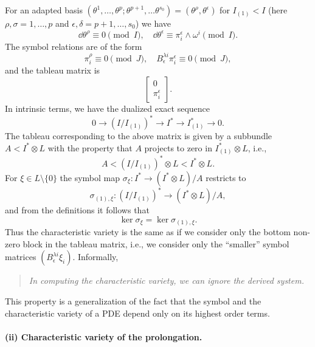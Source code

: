 For an adapted basis $(\theta^1,\ldots,\theta^p;\theta^{p+1},\ldots\theta^{s_0})=(\theta^\rho,\theta^\epsilon)$ for $I_{(1)}<I$ (here $\rho,\sigma=1,\ldots,p$ and $\epsilon,\delta=p+1,\ldots,s_0$) we have 
\[\dd \theta^\rho\equiv 0\pmod{I},\quad \dd\theta^\epsilon\equiv \pi^\epsilon_i\wedge\omega^i\pmod{I}.\]
The symbol relations are of the form 
\[\pi^\rho_i\equiv 0\pmod{J},\quad B^{\lambda i}_\epsilon\pi^\epsilon_i\equiv 0\pmod{J},\]
and the tableau matrix is 
\[\begin{bmatrix}
    0\\\pi^\epsilon_i
\end{bmatrix}.\]
In intrinsic terms, we have the dualized exact sequence 
\[0\to (I\slash I_{(1)})^\ast\to I^\ast\to I^\ast_{(1)}\to 0.\]
The tableau corresponding to the above matrix is given by a subbundle $A<I^\ast\otimes L$ with the property that $A$ projects to zero in $I^\ast_{(1)}\otimes L$, i.e.,
\[A<(I\slash I_{(1)})^\ast \otimes L<I^\ast\otimes L.\]
For $\xi\in L\setminus\{0\}$ the symbol map $\sigma_\xi:I^\ast\to (I^\ast\otimes L)\slash A$ restricts to 
\[\sigma_{(1),\xi}:(I\slash I_{(1)})^\ast\to (I^\ast\otimes L)\slash A,\]
and from the definitions it follows that 
\[\ker\sigma_\xi=\ker\sigma_{(1),\xi}.\]
Thus the characteristic variety is the same as if we consider only the bottom non-zero block in the tableau matrix, i.e., we consider only the ``smaller'' symbol matrices $\left(B^{\lambda i}_\epsilon \xi_i\right)$. Informally, 
\begin{quote}
    \emph{In computing the characteristic variety, we can ignore the derived system.}
\end{quote}
This property is a generalization of the fact that the symbol and the characteristic variety of a PDE depend only on its highest order terms.

\paragraph{(ii) Characteristic variety of the prolongation.}

